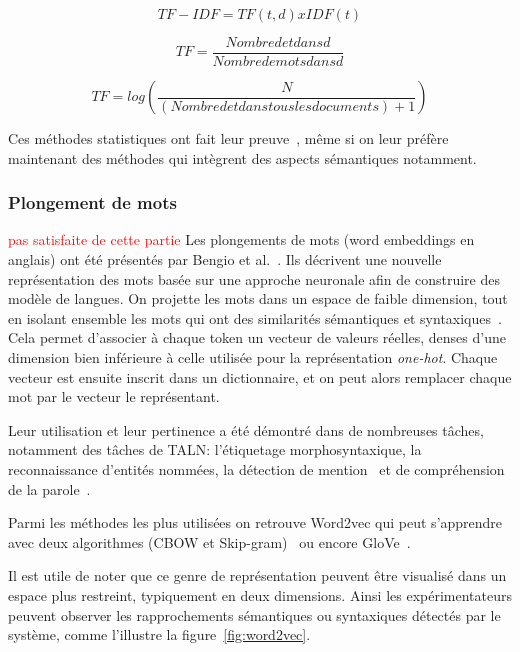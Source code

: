 \begin{equation}
    TF-IDF = TF(t,d) x IDF(t)
\label{eq:tfidf}
\end{equation}

\begin{equation}
    TF = \dfrac{Nombre de t dans d}{Nombre de mots dans d}
\label{eq:tf}
\end{equation}

\begin{equation}
    TF = log(\dfrac{N}{(Nombre de t dans tous les documents) + 1})
\label{eq:idf}
\end{equation}

Ces méthodes statistiques ont fait leur preuve~\cite{Martineau2009,Cambria2013,Pimpalkar2020}, même si on leur préfère maintenant des méthodes qui intègrent des aspects sémantiques notamment.

\subsubsection{Plongement de mots}

\textcolor{red}{pas satisfaite de cette partie}
Les plongements de mots (word embeddings en anglais) ont été présentés par Bengio et al.~\cite{Bengio2003}. Ils décrivent une nouvelle représentation des mots basée sur une approche neuronale afin de construire des modèle de langues.
On projette les mots dans un espace de faible dimension, tout en isolant ensemble les mots qui ont des similarités sémantiques et syntaxiques~\cite{Ghannay2017}. Cela permet d'associer à chaque token un vecteur de valeurs réelles, denses d'une dimension bien inférieure à celle utilisée pour la représentation \textit{one-hot}. Chaque vecteur est ensuite inscrit dans un dictionnaire, et on peut alors remplacer chaque mot par le vecteur le représentant.

Leur utilisation et leur pertinence a été démontré dans de nombreuses tâches, notamment des tâches de TALN: l’étiquetage morphosyntaxique, la reconnaissance d’entités nommées, la détection de mention~\cite{Turian2010,Bansal2014} et de compréhension de la parole~\cite{Mesnil2013,Yao2014,Liu2016}.

Parmi les méthodes les plus utilisées on retrouve Word2vec qui peut s'apprendre avec deux algorithmes (CBOW et Skip-gram)~\cite{word2vec} ou encore GloVe~\cite{Pennington2014}.

Il est utile de noter que ce genre de représentation peuvent être visualisé dans un espace plus restreint, typiquement en deux dimensions. Ainsi les expérimentateurs peuvent observer les rapprochements sémantiques ou syntaxiques détectés par le système, comme l'illustre la figure~\ref{fig:word2vec}.


